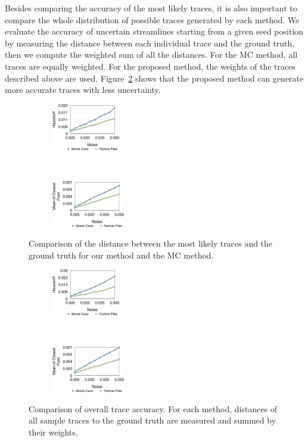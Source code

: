 Besides comparing the accuracy of the most likely traces, it is also important to compare the whole distribution of possible traces generated by each method. We evaluate the accuracy of uncertain streamlines starting from a given seed position by measuring the distance between each individual trace and the ground truth, then we compute the weighted sum of all the distances. For the MC method, all traces are equally weighted. For the proposed method, the weights of the traces described above are used. Figure~\ref{gerror_r} shows that the proposed method can generate more accurate traces with less uncertainty.

\begin{figure}[!htb]
  \centering
  \begin{subfigure}[b]{0.24\textwidth}
    \centering
    \includegraphics[height=0.8in]{../figures/doublegyre_h.eps}
  \end{subfigure}~
  \begin{subfigure}[b]{0.24\textwidth}
    \centering
    \includegraphics[height=0.8in]{../figures/doublegyre_m.eps}
  \end{subfigure}
  \caption{Comparison of the distance between the most likely traces and the ground truth for our method and the MC method.}
  \label{gerror}
\end{figure}

\begin{figure}[!htb]
  \centering
  \begin{subfigure}[b]{0.24\textwidth}
    \centering
    \includegraphics[height=0.8in]{../figures/doublegyre_hr.eps}
  \end{subfigure}~
  \begin{subfigure}[b]{0.24\textwidth}
    \centering
    \includegraphics[height=0.8in]{../figures/doublegyre_mr.eps}
  \end{subfigure}
  \caption{Comparison of overall trace accuracy. For each method, distances of all sample traces to the ground truth are measured and summed by their weights.}
  \label{gerror_r}
\end{figure}

